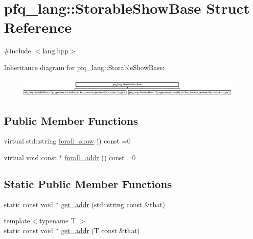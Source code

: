 \hypertarget{structpfq__lang_1_1StorableShowBase}{\section{pfq\+\_\+lang\+:\+:Storable\+Show\+Base Struct Reference}
\label{structpfq__lang_1_1StorableShowBase}
}


{\ttfamily \#include $<$lang.\+hpp$>$}

Inheritance diagram for pfq\+\_\+lang\+:\+:Storable\+Show\+Base\+:\begin{figure}[H]
\begin{center}
\leavevmode
\includegraphics[height=0.955631cm]{structpfq__lang_1_1StorableShowBase}
\end{center}
\end{figure}
\subsection*{Public Member Functions}
\begin{DoxyCompactItemize}
\item 
virtual std\+::string \hyperlink{structpfq__lang_1_1StorableShowBase_aea533aa9bd20171aae76157c9ebbd43e}{forall\+\_\+show} () const =0
\item 
virtual void const $\ast$ \hyperlink{structpfq__lang_1_1StorableShowBase_a7ad3bcb5b59da3fb0f1a82ce1b284afd}{forall\+\_\+addr} () const =0
\end{DoxyCompactItemize}
\subsection*{Static Public Member Functions}
\begin{DoxyCompactItemize}
\item 
static const void $\ast$ \hyperlink{structpfq__lang_1_1StorableShowBase_a964df7b0275fbbf16c6ad55c139f4810}{get\+\_\+addr} (std\+::string const \&that)
\item 
{\footnotesize template$<$typename T $>$ }\\static const void $\ast$ \hyperlink{structpfq__lang_1_1StorableShowBase_a27a48e4b29ec89bb550d4a42613dcb3e}{get\+\_\+addr} (T const \&that)
\end{DoxyCompactItemize}


